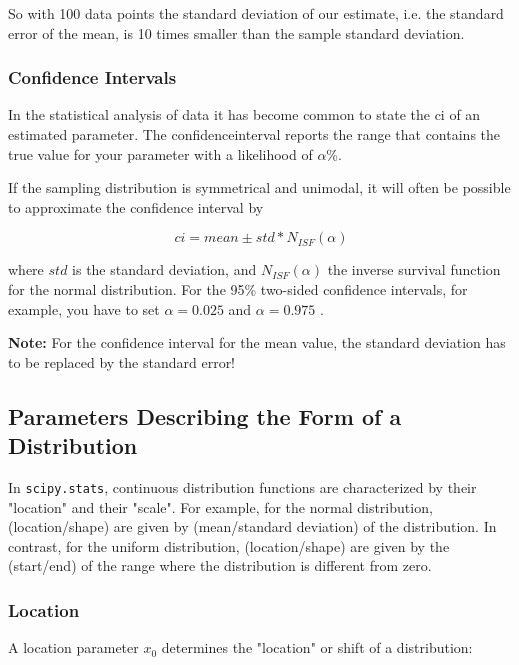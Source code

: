 So with 100 data points the standard deviation of our estimate, i.e. the standard error of the mean, is 10 times smaller than the sample standard deviation.

\subsubsection{Confidence Intervals}

 In the statistical analysis of data it has become common to state the \acrfull{ci} of an estimated parameter. The \gls{confidenceinterval} reports the range that contains the true value for your parameter with a likelihood of $\alpha$\%.

If the sampling distribution is symmetrical and unimodal, it will often be possible to approximate the confidence interval by

\begin{equation}\
  ci = mean \pm std * N_{ISF}(\alpha)
\end{equation}\label{eq:ci}

where $std$ is the  standard deviation, and $N_{ISF}(\alpha)$ the inverse survival function for the normal distribution. For the 95\% two-sided confidence intervals, for example, you have to set $\alpha=0.025$ and $\alpha=0.975$ .

\textbf{Note:} For the confidence interval for the mean value, the standard deviation has to be replaced by the standard error!

\subsection{Parameters Describing the Form of a Distribution}

In \texttt{scipy.stats}, continuous distribution functions are characterized by their "location" and their "scale".
For example, for the normal distribution, (location/shape) are given by (mean/standard deviation) of the distribution. In contrast, for the uniform distribution, (location/shape) are given by the (start/end) of the range where the distribution is different from zero.

\subsubsection{Location}

A \gls{location} parameter $x_0$  determines the "location" or shift of a distribution:

